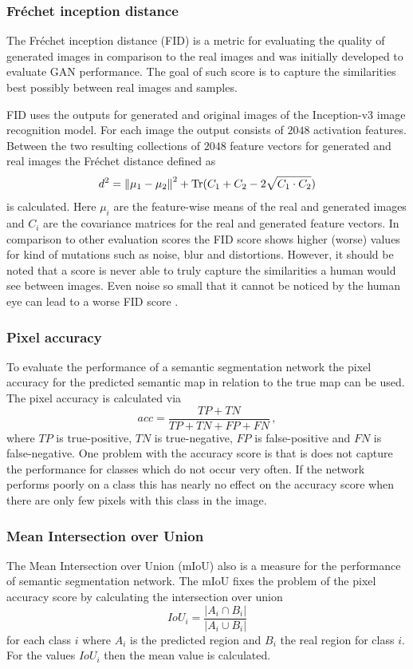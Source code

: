 \subsubsection{Fréchet inception distance} \label{fid}
The Fréchet inception distance (FID) \cite{fid} is a metric for evaluating the quality of generated images in comparison to the real images and was initially developed to evaluate GAN performance. The goal of such score is to capture the similarities best possibly between real images and samples.

FID uses the outputs for generated and original images of the Inception-v3 \cite{inception-v3} image recognition model. For each image the output consists of $2048$ activation features. Between the two resulting collections of $2048$ feature vectors for generated and real images the Fréchet distance defined as 
%
\begin{equation}
    d^2=\left\lVert\mu_1-\mu_2\right\rVert^2+\text{Tr}(C_1+C_2-2\sqrt{C_1\cdot C_2})
\end{equation}
%
is calculated. Here $\mu_i$ are the feature-wise means of the real and generated images and $C_i$ are the covariance matrices for the real and generated feature vectors. In comparison to other evaluation scores the FID score shows higher (worse) values for  kind of mutations such as noise, blur and distortions. However, it should be noted that a score is never able to truly capture the similarities a human would see between images. Even noise so small that it cannot be noticed by the human eye can lead to a worse FID score \cite{score_4}.

\subsubsection{Pixel accuracy} \label{acc}
To evaluate the performance of a semantic segmentation network the pixel accuracy for the predicted semantic map in relation to the true map can be used. The pixel accuracy is calculated via
%
\begin{equation}
    acc=\frac{TP+TN}{TP+TN+FP+FN}\,,
\end{equation}
%
where $TP$ is true-positive, $TN$ is true-negative, $FP$ is false-positive and $FN$ is false-negative. One problem with the accuracy score is that is does not capture the performance for classes which do not occur very often. If the network performs poorly on a class this has nearly no effect on the accuracy score when there are only few pixels with this class in the image.
%
\subsubsection{Mean Intersection over Union} \label{iou}
The Mean Intersection over Union (mIoU) also is a measure for the performance of semantic segmentation network. The mIoU fixes the problem of the pixel accuracy score by calculating the intersection over union
%
\begin{equation}
    IoU_{i}=\frac{|A_i\cap B_i|}{|A_i \cup B_i|}
\end{equation}
%
for each class $i$ where $A_i$ is the predicted region and $B_i$ the real region for class $i$. For the values $IoU_i$ then the mean value is calculated.
%
